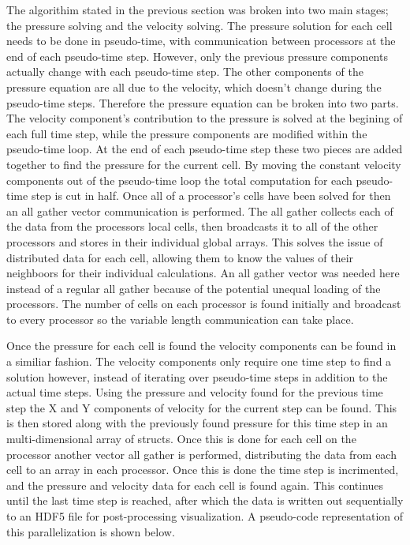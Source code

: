 \documentclass[12pt]{article}
\begin{document}
The algorithim stated in the previous section was broken into two main stages; the pressure solving and the velocity 
solving. The pressure solution for each cell needs to be done in pseudo-time, with communication between processors at 
the end of each pseudo-time step. However, only the previous pressure components actually change with each pseudo-time 
step. The other components of the pressure equation are all due to the velocity, which doesn't change during the 
pseudo-time steps. Therefore the pressure equation can be broken into two parts. The velocity component's contribution 
to the pressure is solved at the begining of each full time step, while the pressure components are modified within 
the pseudo-time loop. At the end of each pseudo-time step these two pieces are added together to find the pressure for 
the current cell. By moving the constant velocity components out of the pseudo-time loop the total computation for 
each pseudo-time step is cut in half. Once all of a processor's cells have been solved for then an all gather vector 
communication is performed. The all gather collects each of the data from the processors local cells, then broadcasts 
it to all of the other processors and stores in their individual global arrays. This solves the issue of distributed 
data for each cell, allowing them to know the values of their neighboors for their individual calculations. An all 
gather vector was needed here instead of a regular all gather because of the potential unequal loading of the 
processors. The number of cells on each processor is found initially and broadcast to every processor so the 
variable length communication can take place.

Once the pressure for each cell is found the velocity components can be found in a similiar fashion. The velocity 
components only require one time step to find a solution however, instead of iterating over pseudo-time steps in 
addition to the actual time steps. Using the pressure and velocity found for the previous time step the X and Y 
components of velocity for the current step can be found. This is then stored along with the previously found pressure 
for this time step in an multi-dimensional array of structs. Once this is done for each cell on the processor another 
vector all gather is performed, distributing the data from each cell to an array in each processor. Once this is done 
the time step is incrimented, and the pressure and velocity data for each cell is found again. This continues until 
the last time step is reached, after which the data is written out sequentially to an HDF5 file for post-processing 
visualization. A pseudo-code representation of this parallelization is shown below.
\end{document}
